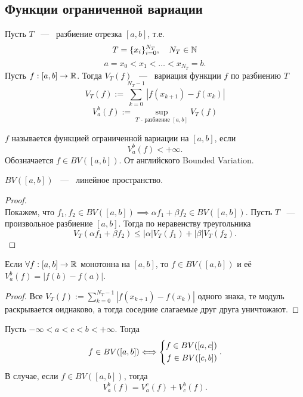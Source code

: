\subsection{Функции ограниченной вариации}
\begin{definition}
	Пусть $T$ ~---~ разбиение отрезка $[a, b]$, т.е. \[
		T = \{x_i\}_{i=0}^{N_T}, \quad N_T \in \mathbb{N}
	\]\[
		a = x_0 < x_1 < \dots < x_{N_T} = b.
	\]
	Пусть $f: [a, b] \rightarrow \mathbb{R}$. Тогда $V_T(f)$ ~---~ вариация функции $f$ по разбиению $T$\[
		V_T(f) := \sum_{k=0}^{N_T-1} |f(x_{k+1}) - f(x_k)|
	\]
	\[
		V_a^b(f) := \sup_{T\text{ - разбиение } [a, b]} V_T(f)
	\]
\end{definition}
\begin{definition}
	$f$ называется функцией ограниченной вариации на $[a, b]$, если\[
	V_a^b (f) < +\infty.
	\]
	Обозначается $f\in BV([a, b])$. От английского Bounded Variation.
\end{definition}
\begin{theorem}
	$BV([a,b])$ ~---~ линейное пространство.
\end{theorem}
\begin{proof} \ \\
	Покажем, что $f_1, f_2 \in BV([a, b]) \implies \alpha f_1 + \beta f_2 \in BV([a, b])$. Пусть $T$ ~---~ произвольное разбиение $[a, b]$. Тогда по неравенству треугольника \[
		V_T(\alpha f_1 + \beta f_2)
		\leq
		|\alpha| V_T(f_1) + |\beta| V_T(f_2).
	\]
\end{proof}
\begin{lemma}
	Если $\forall f: [a, b] \rightarrow \mathbb{R}$ монотонна на $[a, b]$, то $f \in BV([a, b])$ и её $V_a^b (f) = |f(b) - f(a)|$.
\end{lemma}
\begin{proof}
	Все $V_T(f) := \sum_{k=0}^{N_T-1} |f(x_{k+1}) - f(x_k)|$ одного знака, те модуль раскрывается оиднаково, а тогда соседние слагаемые друг друга уничтожают.
\end{proof}
\begin{lemma}
	Пусть $-\infty < a < c < b < +\infty$. Тогда
	\[
	f \in BV([a, b]) \Longleftrightarrow \left\{\begin{aligned}f \in BV([a, c]) \\ f \in BV([c, b])\end{aligned}\right..
	\]
	В случае, если $f \in BV([a, b])$, тогда \[
		V_a^b (f) = V_a^c (f) + V_c^b (f).
	\]
\end{lemma}
